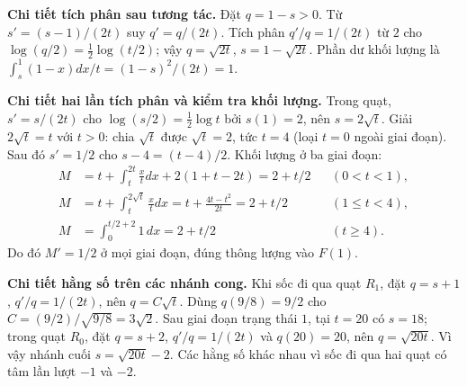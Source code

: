 \textbf{Chi tiết tích phân sau tương tác.} Đặt $q=1-s>0$. Từ $s'=(s-1)/(2t)$ suy $q'=q/(2t)$. Tích phân $q'/q=1/(2t)$ từ $2$ cho $\log(q/2)=\frac12\log(t/2)$; vậy $q=\sqrt{2t}$, $s=1-\sqrt{2t}$. Phần dư khối lượng là $\int_s^1(1-x)dx/t=(1-s)^2/(2t)=1$.

\textbf{Chi tiết hai lần tích phân và kiểm tra khối lượng.} Trong quạt, $s'=s/(2t)$ cho $\log(s/2)=\frac12\log t$ bởi $s(1)=2$, nên $s=2\sqrt t$. Giải $2\sqrt t=t$ với $t>0$: chia $\sqrt t$ được $\sqrt t=2$, tức $t=4$ (loại $t=0$ ngoài giai đoạn). Sau đó $s'=1/2$ cho $s-4=(t-4)/2$. Khối lượng ở ba giai đoạn:
\[\begin{aligned}
M&=t+\int_t^{2t}\frac xtdx+2(1+t-2t)=2+t/2 &&(0<t<1),\\
M&=t+\int_t^{2\sqrt t}\frac xtdx=t+\frac{4t-t^2}{2t}=2+t/2 &&(1\le t<4),\\
M&=\int_0^{t/2+2}1\,dx=2+t/2 &&(t\ge4).
\end{aligned}\]
Do đó $M'=1/2$ ở mọi giai đoạn, đúng thông lượng vào $F(1)$.

\textbf{Chi tiết hằng số trên các nhánh cong.} Khi sốc đi qua quạt $R_1$, đặt $q=s+1$, $q'/q=1/(2t)$, nên $q=C\sqrt t$. Dùng $q(9/8)=9/2$ cho $C=(9/2)/\sqrt{9/8}=3\sqrt2$. Sau giai đoạn trạng thái $1$, tại $t=20$ có $s=18$; trong quạt $R_0$, đặt $q=s+2$, $q'/q=1/(2t)$ và $q(20)=20$, nên $q=\sqrt{20t}$. Vì vậy nhánh cuối $s=\sqrt{20t}-2$. Các hằng số khác nhau vì sốc đi qua hai quạt có tâm lần lượt $-1$ và $-2$.
